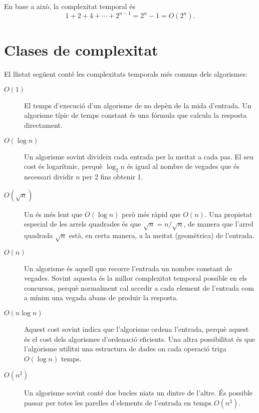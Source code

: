 En base a això, la complexitat temporal és
\[1+2+4+\cdots+2^{n-1} = 2^n-1 = O(2^n).\]

\section{Clases de complexitat}


El llistat següent conté les complexitats temporals
més comuns dels algorismes:

\begin{description}
\item[$O(1)$]
El temps d'execució d'un algorisme de 
no depèn de la mida d'entrada.
Un algorisme típic de temps constant és una fórmula que
calcula la resposta directament.

\item[$O(\log n)$]
Un algorisme  sovint
divideix cada entrada per la meitat a cada pas.
El seu cost és logarítmic, perquè
$\log_2 n$ és igual al nombre de vegades que
és necessari dividir $n$ per 2 fins obtenir 1.

\item[$O(\sqrt n)$]
Un  és més lent que
$O(\log n)$ però més ràpid que $O(n)$.
Una propietat especial de les arrels quadrades és que
$\sqrt n = n/\sqrt n$, de manera que l'arrel quadrada
$\sqrt n$ està, en certa manera, a la meitat (geomètrica)
de l'entrada.

\item[$O(n)$]
Un algorisme  és aquell que recorre l'entrada
un nombre constant de vegades.
Sovint aquesta és la millor complexitat temporal possible
en els concursos, perquè normalment cal accedir a cada
element de l'entrada com a mínim una vegada abans
de produir la resposta.

\item[$O(n \log n)$]
Aquest cost sovint indica que l'algorisme ordena l'entrada,
perquè aquest és el cost dels algorismes d'ordenació
eficients. Una altra possibilitat és que l'algorisme
utilitzi una estructura de dades on cada operació
triga $O(\log n)$ temps.

\item[$O(n^2)$]
Un algorisme  sovint conté
dos bucles niats un dintre de l'altre.
És possible passar per totes les parelles
d'elements de l'entrada en temps $O(n^2)$.


\end{description}
